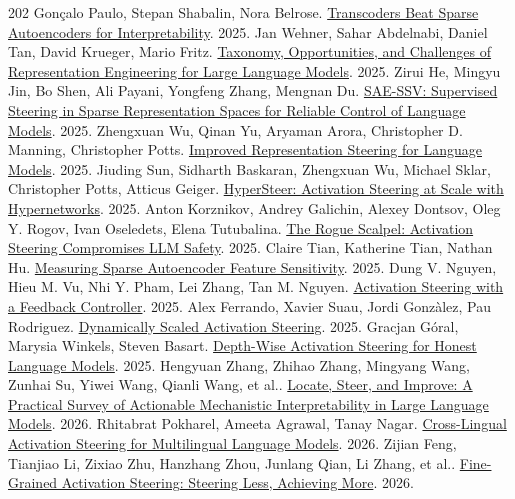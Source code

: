 \begin{thebibliography}{202}
 Gonçalo Paulo, Stepan Shabalin, Nora Belrose. \href{https://arxiv.org/abs/2501.18823v2}{Transcoders Beat Sparse Autoencoders for Interpretability}. 2025.
 Jan Wehner, Sahar Abdelnabi, Daniel Tan, David Krueger, Mario Fritz. \href{https://arxiv.org/abs/2502.19649v5}{Taxonomy, Opportunities, and Challenges of Representation Engineering for Large Language Models}. 2025.
 Zirui He, Mingyu Jin, Bo Shen, Ali Payani, Yongfeng Zhang, Mengnan Du. \href{https://arxiv.org/abs/2505.16188v2}{SAE-SSV: Supervised Steering in Sparse Representation Spaces for Reliable Control of Language Models}. 2025.
 Zhengxuan Wu, Qinan Yu, Aryaman Arora, Christopher D. Manning, Christopher Potts. \href{https://arxiv.org/abs/2505.20809v1}{Improved Representation Steering for Language Models}. 2025.
 Jiuding Sun, Sidharth Baskaran, Zhengxuan Wu, Michael Sklar, Christopher Potts, Atticus Geiger. \href{https://arxiv.org/abs/2506.03292v1}{HyperSteer: Activation Steering at Scale with Hypernetworks}. 2025.
 Anton Korznikov, Andrey Galichin, Alexey Dontsov, Oleg Y. Rogov, Ivan Oseledets, Elena Tutubalina. \href{https://arxiv.org/abs/2509.22067v2}{The Rogue Scalpel: Activation Steering Compromises LLM Safety}. 2025.
 Claire Tian, Katherine Tian, Nathan Hu. \href{https://arxiv.org/abs/2509.23717v1}{Measuring Sparse Autoencoder Feature Sensitivity}. 2025.
 Dung V. Nguyen, Hieu M. Vu, Nhi Y. Pham, Lei Zhang, Tan M. Nguyen. \href{https://arxiv.org/abs/2510.04309v3}{Activation Steering with a Feedback Controller}. 2025.
 Alex Ferrando, Xavier Suau, Jordi Gonzàlez, Pau Rodriguez. \href{https://arxiv.org/abs/2512.03661v2}{Dynamically Scaled Activation Steering}. 2025.
 Gracjan Góral, Marysia Winkels, Steven Basart. \href{https://arxiv.org/abs/2512.07667v1}{Depth-Wise Activation Steering for Honest Language Models}. 2025.
 Hengyuan Zhang, Zhihao Zhang, Mingyang Wang, Zunhai Su, Yiwei Wang, Qianli Wang, et al.. \href{https://arxiv.org/abs/2601.14004}{Locate, Steer, and Improve: A Practical Survey of Actionable Mechanistic Interpretability in Large Language Models}. 2026.
 Rhitabrat Pokharel, Ameeta Agrawal, Tanay Nagar. \href{https://arxiv.org/abs/2601.16390v2}{Cross-Lingual Activation Steering for Multilingual Language Models}. 2026.
 Zijian Feng, Tianjiao Li, Zixiao Zhu, Hanzhang Zhou, Junlang Qian, Li Zhang, et al.. \href{https://arxiv.org/abs/2602.04428v1}{Fine-Grained Activation Steering: Steering Less, Achieving More}. 2026.

\end{thebibliography}
